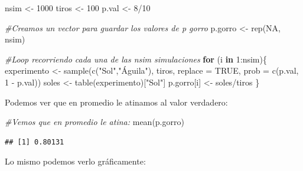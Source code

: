 \documentclass[
]{book}
\newenvironment{Shaded}{\begin{snugshade}}{\end{snugshade}}
\newcommand{\AttributeTok}[1]{\textcolor[rgb]{0.77,0.63,0.00}{#1}}
\newcommand{\CommentTok}[1]{\textcolor[rgb]{0.56,0.35,0.01}{\textit{#1}}}
\newcommand{\ConstantTok}[1]{\textcolor[rgb]{0.00,0.00,0.00}{#1}}
\newcommand{\ControlFlowTok}[1]{\textcolor[rgb]{0.13,0.29,0.53}{\textbf{#1}}}
\newcommand{\DecValTok}[1]{\textcolor[rgb]{0.00,0.00,0.81}{#1}}
\newcommand{\FunctionTok}[1]{\textcolor[rgb]{0.00,0.00,0.00}{#1}}
\newcommand{\NormalTok}[1]{#1}
\newcommand{\OtherTok}[1]{\textcolor[rgb]{0.56,0.35,0.01}{#1}}
\newcommand{\SpecialCharTok}[1]{\textcolor[rgb]{0.00,0.00,0.00}{#1}}
\newcommand{\StringTok}[1]{\textcolor[rgb]{0.31,0.60,0.02}{#1}}
\begin{document}
\begin{Shaded}
\begin{Highlighting}[]
\NormalTok{nsim  }\OtherTok{\textless{}{-}} \DecValTok{1000}
\NormalTok{tiros }\OtherTok{\textless{}{-}} \DecValTok{100}
\NormalTok{p.val }\OtherTok{\textless{}{-}} \DecValTok{8}\SpecialCharTok{/}\DecValTok{10}

\CommentTok{\#Creamos un vector para guardar los valores de p gorro}
\NormalTok{p.gorro }\OtherTok{\textless{}{-}} \FunctionTok{rep}\NormalTok{(}\ConstantTok{NA}\NormalTok{, nsim)}

\CommentTok{\#Loop recorriendo cada una de las nsim simulaciones}
\ControlFlowTok{for}\NormalTok{ (i }\ControlFlowTok{in} \DecValTok{1}\SpecialCharTok{:}\NormalTok{nsim)\{}
\NormalTok{  experimento }\OtherTok{\textless{}{-}} \FunctionTok{sample}\NormalTok{(}\FunctionTok{c}\NormalTok{(}\StringTok{"Sol"}\NormalTok{,}\StringTok{"Águila"}\NormalTok{), tiros, }\AttributeTok{replace =} \ConstantTok{TRUE}\NormalTok{, }
                        \AttributeTok{prob =} \FunctionTok{c}\NormalTok{(p.val, }\DecValTok{1} \SpecialCharTok{{-}}\NormalTok{ p.val))}
\NormalTok{  soles       }\OtherTok{\textless{}{-}} \FunctionTok{table}\NormalTok{(experimento)[}\StringTok{"Sol"}\NormalTok{]}
\NormalTok{  p.gorro[i]  }\OtherTok{\textless{}{-}}\NormalTok{ soles}\SpecialCharTok{/}\NormalTok{tiros}
\NormalTok{\}}
\end{Highlighting}
\end{Shaded}

Podemos ver que en promedio le atinamos al valor verdadero:

\begin{Shaded}
\begin{Highlighting}[]
\CommentTok{\#Vemos que en promedio le atina:}
\FunctionTok{mean}\NormalTok{(p.gorro)}
\end{Highlighting}
\end{Shaded}

\begin{verbatim}
## [1] 0.80131
\end{verbatim}

Lo mismo podemos verlo gráficamente:
\end{document}
